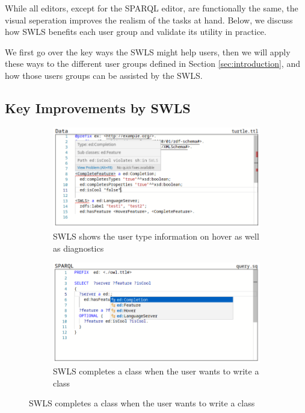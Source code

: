 While all editors, except for the SPARQL editor, are functionally the same, 
the visual seperation improves the realism of the tasks at hand.
Below, we discuss how SWLS benefits each user group and validate its utility in practice.

We first go over the key ways the SWLS might help users, then we will apply these ways to the different user groups defined in Section \ref{sec:introduction}, 
and how those users groups can be assisted by the SWLS.

\subsection{Key Improvements by SWLS}

\begin{figure}[tb]
    \centering
    \begin{subfigure}{0.48\textwidth}
      \includegraphics[width=\textwidth]{./images/hover.png}
      \caption{SWLS shows the user type information on hover as well as diagnostics}
      \label{hover}
    \end{subfigure}
    \hfill
    \begin{subfigure}{0.48\textwidth}
      \includegraphics[width=\textwidth]{./images/class.png}
      \caption{SWLS completes a class when the user wants to write a class}

\end{subfigure}
\end{figure}
